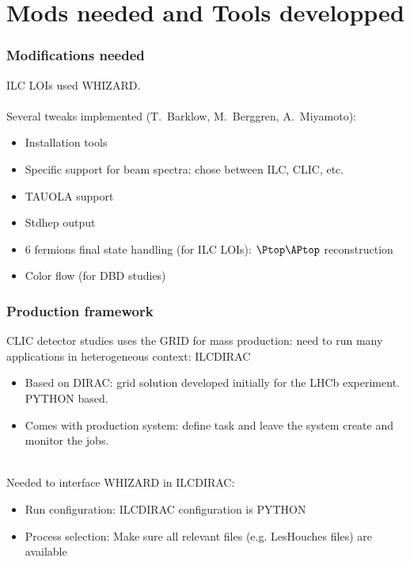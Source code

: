 \documentclass{beamer}
\newcommand{\whizard}{WHIZARD\xspace}
\begin{document}
\section{Mods needed and Tools developped}
\begin{frame}
\frametitle{Modifications needed}
ILC LOIs used \whizard.\\
~\\
Several tweaks implemented (T.~Barklow, M.~Berggren, A.~Miyamoto):
\begin{itemize}
  \item Installation tools
  \item Specific support for beam spectra: chose between ILC, CLIC, etc.
  \item TAUOLA support
  \item Stdhep output
  \item 6 fermions final state handling (for ILC LOIs): $\Ptop\APtop$
  reconstruction
  \item Color flow (for DBD studies)
\end{itemize}
\end{frame}

\begin{frame}
\frametitle{Production framework}
CLIC detector studies uses the {\color{blue} GRID} for mass production: need to
run many applications in heterogeneous context: \alert{ILCDIRAC}
\begin{itemize}
  \item Based on DIRAC: grid solution developed initially for the LHCb
  experiment. {\color{blue}PYTHON} based.
  \item Comes with production system: define task and leave the system create
  and monitor the jobs.
\end{itemize}
~\\
Needed to interface \whizard in ILCDIRAC:
\begin{itemize}
  \item Run configuration: ILCDIRAC configuration is PYTHON
  \item Process selection: Make sure all relevant files (e.g. LesHouches files)
  are available
\end{itemize}
\end{frame}
\end{document}
